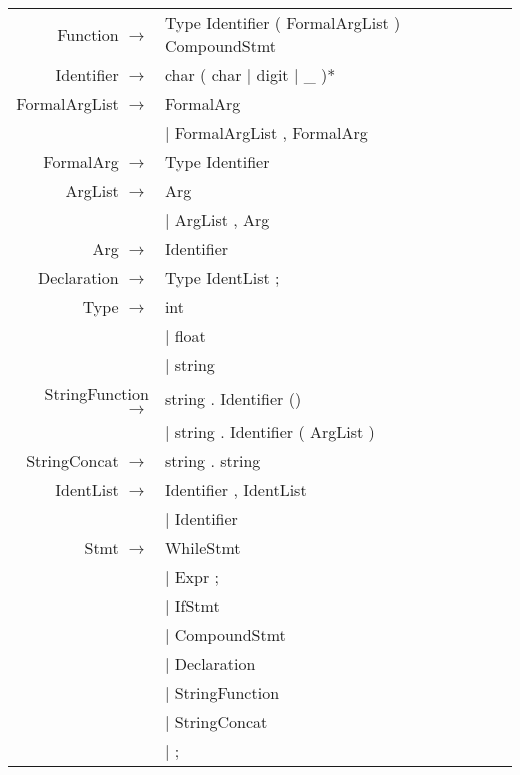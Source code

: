 \documentclass[12pt]{article}
\begin{document}
\begin{longtable}{ r l }
	Function 		$\rightarrow$ 	& Type Identifier ( FormalArgList ) CompoundStmt \\
	Identifier		$\rightarrow$   & char ( char $|$ digit $|$ \_ )* \\
	FormalArgList 	$\rightarrow$ 	& FormalArg \\
									& $|$ FormalArgList , FormalArg \\
	FormalArg 		$\rightarrow$ 	& Type Identifier \\
	ArgList			$\rightarrow$ 	& Arg \\
									& $|$ ArgList , Arg \\
	Arg				$\rightarrow$ 	& Identifier \\
	Declaration		$\rightarrow$ 	& Type IdentList ; \\
	Type			$\rightarrow$ 	& int \\
									& $|$ float \\
									& $|$ string \\
	StringFunction	$\rightarrow$	& string . Identifier () \\
									& $|$ string . Identifier ( ArgList ) \\
	StringConcat	$\rightarrow$	& string . string \\
	IdentList		$\rightarrow$ 	& Identifier , IdentList \\
									& $|$ Identifier \\
	Stmt 			$\rightarrow$ 	& WhileStmt \\
									& $|$ Expr ; \\
									& $|$ IfStmt \\
									& $|$ CompoundStmt \\
									& $|$ Declaration \\
									& $|$ StringFunction \\
									& $|$ StringConcat \\
									& $|$ ; \\

\end{longtable}
\end{document}
